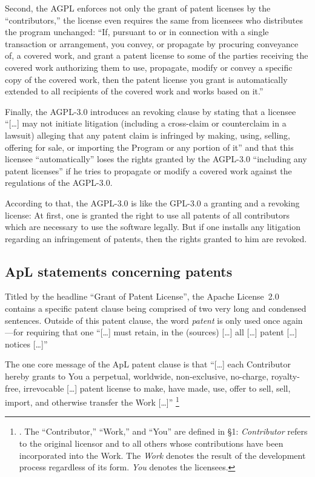 Second, the AGPL enforces not only the grant of patent licenses by the
\enquote{contributors,} the license even requires the same from licensees who
distributes the program unchanged: \enquote{If, pursuant to or in connection
with a single transaction or arrangement, you convey, or propagate by procuring
conveyance of, a covered work, and grant a patent license to some of the parties
receiving the covered work authorizing them to use, propagate, modify or convey
a specific copy of the covered work, then the patent license you grant is
automatically extended to all recipients of the covered work and works based on
it.}

Finally, the AGPL-3.0 introduces an revoking clause by stating that a licensee
\enquote{[\ldots] may not initiate litigation (including a cross-claim or
counterclaim in a lawsuit) alleging that any patent claim is infringed by
making, using, selling, offering for sale, or importing the Program or any
portion of it} and that this licensee \enquote{automatically}
loses the rights granted by the AGPL-3.0 \enquote{including any patent
licenses} if he tries to propagate or modify a covered work against the
regulations of the AGPL-3.0. 

According to that, the AGPL-3.0 is like the GPL-3.0 a granting and a revoking
license: At first, one is granted the right to use all patents of all
contributors which are necessary to use the software legally. But if one
installs any litigation regarding an infringement of patents, then the rights
granted to him are revoked.


\subsection{ApL statements concerning patents}

Titled by the headline \enquote{Grant of Patent License}, the Apache License~2.0
contains a specific patent clause being comprised of two very long and condensed
sentences. Outside of this patent clause, the word \emph{patent} is
only used once again---for requiring that one \enquote{[\ldots] must retain, in
the (sources) [\ldots] all [\ldots] patent [\ldots] notices [\ldots]}

The one core message of the ApL patent clause is that
\enquote{[\ldots] each Contributor hereby grants to You a perpetual, worldwide,
non-exclusive, no-charge, royalty-free, irrevocable [\ldots] patent license to
make, have made, use, offer to sell, sell, import, and otherwise transfer the
Work [\ldots]}%
  \footnote{\cite[cf.][\nopage wp §3]{Apl20OsiLicense2004a}. The
  \enquote{Contributor,} \enquote{Work,} and \enquote{You} are defined in §1:
  \emph{Contributor} refers to the original licensor and to all others whose
  contributions have been incorporated into the Work. The \emph{Work} denotes
  the result of the development process regardless of its form. \emph{You}
  denotes the licensees.}

